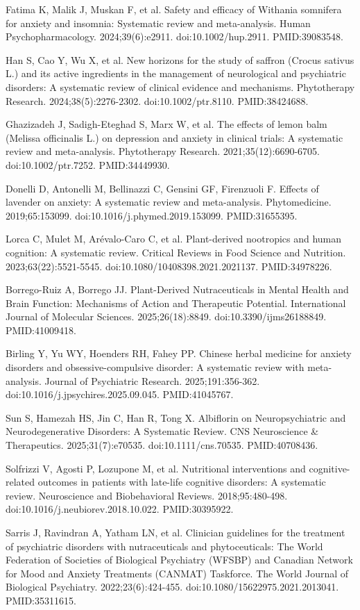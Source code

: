 \documentclass[11pt,oneside]{book}
\newcommand{\reff}[2]{\par\hangindent=7mm\hangafter=1\noindent[#1]\hspace{2mm}#2\par}
\begin{document}
\reff{46}{Fatima K, Malik J, Muskan F, et al. Safety and efficacy of Withania somnifera for anxiety and insomnia: Systematic review and meta-analysis. Human Psychopharmacology. 2024;39(6):e2911. doi:10.1002/hup.2911. PMID:39083548.}
\reff{47}{Han S, Cao Y, Wu X, et al. New horizons for the study of saffron (Crocus sativus L.) and its active ingredients in the management of neurological and psychiatric disorders: A systematic review of clinical evidence and mechanisms. Phytotherapy Research. 2024;38(5):2276-2302. doi:10.1002/ptr.8110. PMID:38424688.}
\reff{48}{Ghazizadeh J, Sadigh-Eteghad S, Marx W, et al. The effects of lemon balm (Melissa officinalis L.) on depression and anxiety in clinical trials: A systematic review and meta-analysis. Phytotherapy Research. 2021;35(12):6690-6705. doi:10.1002/ptr.7252. PMID:34449930.}
\reff{49}{Donelli D, Antonelli M, Bellinazzi C, Gensini GF, Firenzuoli F. Effects of lavender on anxiety: A systematic review and meta-analysis. Phytomedicine. 2019;65:153099. doi:10.1016/j.phymed.2019.153099. PMID:31655395.}
\reff{50}{Lorca C, Mulet M, Arévalo-Caro C, et al. Plant-derived nootropics and human cognition: A systematic review. Critical Reviews in Food Science and Nutrition. 2023;63(22):5521-5545. doi:10.1080/10408398.2021.2021137. PMID:34978226.}
\reff{51}{Borrego-Ruiz A, Borrego JJ. Plant-Derived Nutraceuticals in Mental Health and Brain Function: Mechanisms of Action and Therapeutic Potential. International Journal of Molecular Sciences. 2025;26(18):8849. doi:10.3390/ijms26188849. PMID:41009418.}
\reff{52}{Birling Y, Yu WY, Hoenders RH, Fahey PP. Chinese herbal medicine for anxiety disorders and obsessive-compulsive disorder: A systematic review with meta-analysis. Journal of Psychiatric Research. 2025;191:356-362. doi:10.1016/j.jpsychires.2025.09.045. PMID:41045767.}
\reff{53}{Sun S, Hamezah HS, Jin C, Han R, Tong X. Albiflorin on Neuropsychiatric and Neurodegenerative Disorders: A Systematic Review. CNS Neuroscience \& Therapeutics. 2025;31(7):e70535. doi:10.1111/cns.70535. PMID:40708436.}
\reff{54}{Solfrizzi V, Agosti P, Lozupone M, et al. Nutritional interventions and cognitive-related outcomes in patients with late-life cognitive disorders: A systematic review. Neuroscience and Biobehavioral Reviews. 2018;95:480-498. doi:10.1016/j.neubiorev.2018.10.022. PMID:30395922.}
\reff{55}{Sarris J, Ravindran A, Yatham LN, et al. Clinician guidelines for the treatment of psychiatric disorders with nutraceuticals and phytoceuticals: The World Federation of Societies of Biological Psychiatry (WFSBP) and Canadian Network for Mood and Anxiety Treatments (CANMAT) Taskforce. The World Journal of Biological Psychiatry. 2022;23(6):424-455. doi:10.1080/15622975.2021.2013041. PMID:35311615.}
\end{document}
